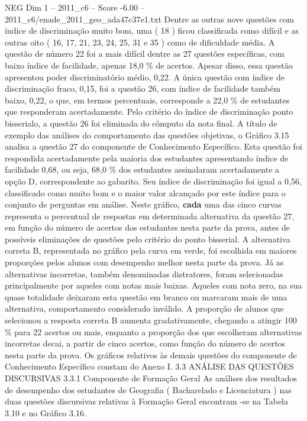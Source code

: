 \begin{textsample}{NEG Dim 1 – 2011\_c6 – Score -6.00 – 2011\_c6/enade\_2011\_geo\_ada47c37e1.txt}
Dentre as outras nove questões com índice de discriminação muito bom, uma ( 18 ) ficou classificada como difícil e as outras oito ( 16, 17, 21, 23, 24, 25, 31 e 35 ) como de dificuldade média.
A questão de número 22 foi a mais difícil dentre as 27 questões específicas, com baixo índice de facilidade, apenas 18,0 \% de acertos.
Apesar disso, essa questão apresentou poder discriminatório médio, 0,22.
A única questão com índice de discriminação fraco, 0,15, foi a questão 26, com índice de facilidade também baixo, 0,22, o que, em termos percentuais, corresponde a 22,0 \% de estudantes que responderam acertadamente.
Pelo critério do índice de discriminação ponto bisserialo, a questão 26 foi eliminada do cômputo da nota final.
A título de exemplo das análises do comportamento das questões objetivas, o Gráfico 3.15 analisa a questão 27 do componente de Conhecimento Específico.
Esta questão foi respondida acertadamente pela maioria dos estudantes apresentando índice de facilidade 0,68, ou seja, 68,0 \% dos estudantes assinalaram acertadamente a opção D, correspondente ao gabarito.
Seu índice de discriminação foi igual a 0,56, classificado como muito bom e o maior valor alcançado por este índice para o conjunto de perguntas em análise.
Neste gráfico, \textbf{cada} uma das cinco curvas representa o percentual de respostas em determinada alternativa da questão 27, em função do número de acertos dos estudantes nesta parte da prova, antes de possíveis eliminações de questões pelo critério do ponto bisserial.
A alternativa correta B, representada no gráfico pela curva em verde, foi escolhida em maiores proporções pelos alunos com desempenho melhor nesta parte da prova.
Já as alternativas incorretas, também denominadas distratores, foram selecionadas principalmente por aqueles com notas mais baixas.
Aqueles com nota zero, na sua quase totalidade deixaram esta questão em branco ou marcaram mais de uma alternativa, comportamento considerado inválido.
A proporção de alunos que selecionou a resposta correta B aumenta gradativamente, chegando a atingir 100 \% para 22 acertos ou mais, enquanto a proporção dos que escolheram alternativas incorretas decai, a partir de cinco acertos, como função do número de acertos nesta parte da prova.
Os gráficos relativos às demais questões do componente de Conhecimento Específico constam do Anexo I. 3.3 ANÁLISE DAS QUESTÕES DISCURSIVAS 3.3.1 Componente de Formação Geral As análises dos resultados de desempenho dos estudantes de Geografia ( Bacharelado e Licenciatura ) nas duas questões discursivas relativas à Formação Geral encontram -se na Tabela 3.10 e no Gráfico 3.16.

\end{textsample}
